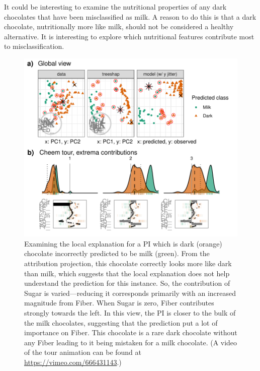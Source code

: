 \documentclass[11pt,twoside]{article}
\begin{document}
It could be interesting to examine the nutritional properties of any dark chocolates that have been misclassified as milk. A reason to do this is that a dark chocolate, nutritionally more like milk, should not be considered a healthy alternative. It is interesting to explore which nutritional features contribute most to misclassification.



\begin{figure}

{\centering \includegraphics[width=1\linewidth]{./figures/case_chocolates} 

}

\caption{Examining the local explanation for a PI which is dark (orange) chocolate incorrectly predicted to be milk (green). From the attribution projection, this chocolate correctly looks more like dark than milk, which suggests that the local explanation does not help understand the prediction for this instance. So, the contribution of Sugar is varied---reducing it corresponds primarily with an increased magnitude from Fiber. When Sugar is zero, Fiber contributes strongly towards the left. In this view, the PI is closer to the bulk of the milk chocolates, suggesting that the prediction put a lot of importance on Fiber. This chocolate is a rare dark chocolate without any Fiber leading to it being mistaken for a milk chocolate. (A video of the tour animation can be found at \url{https://vimeo.com/666431143}.)}\label{fig:casechocolates}
\end{figure}
\end{document}
